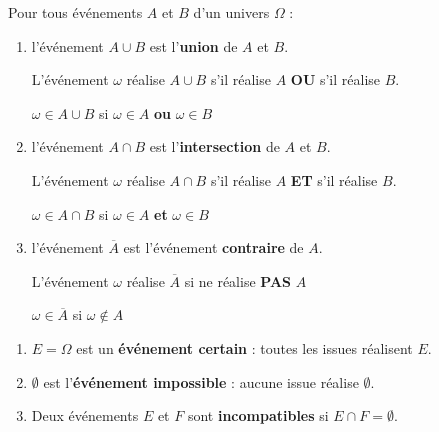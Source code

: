 \documentclass[main.tex]{subfiles}
\begin{document}
\begin{definition}
	Pour tous événements $A$ et $B$ d'un univers $\Omega$ : 
	\begin{enumerate}[label=\textbullet,leftmargin=*] 
		\item  l'événement $A\cup B$  est l'\textbf{union} de  $A$ et $B$.
		
		L'événement $\omega$ réalise $A\cup B$ s'il réalise $A$ \textbf{OU} s'il réalise $B$.
		
		$\omega \in A\cup B$ si $\omega \in A$ \textbf{ou} $\omega \in B$ 
		\item   l'événement $A\cap B$  est l'\textbf{intersection} de  $A$ et $B$. 
		
		L'événement $\omega$ réalise $A\cap B$ s'il réalise $A$ \textbf{ET} s'il réalise $B$.
		
		$\omega \in A\cap B$ si $\omega \in A$ \textbf{et} $\omega \in B$  
		\item l'événement $\overline{A}$  est l'événement \textbf{contraire} de $A$. 
		
		L'événement $\omega$ réalise $\overline{A}$ si ne réalise \textbf{PAS} $A$
		
		$\omega \in \overline{A}$ si $\omega\notin A$
	\end{enumerate} 
\end{definition} 
\begin{enumerate}[label=\textbullet, leftmargin=*]
	\item $E=\Omega$ est un \textbf{événement certain} : toutes les issues réalisent $E$.
	\item $\emptyset$ est l'\textbf{événement impossible} :  aucune issue réalise $\emptyset$. 
	\item Deux événements $E$ et $F$ sont \textbf{incompatibles} si $E\cap F=\emptyset$.
\end{enumerate}
%	
%	
\end{document}
